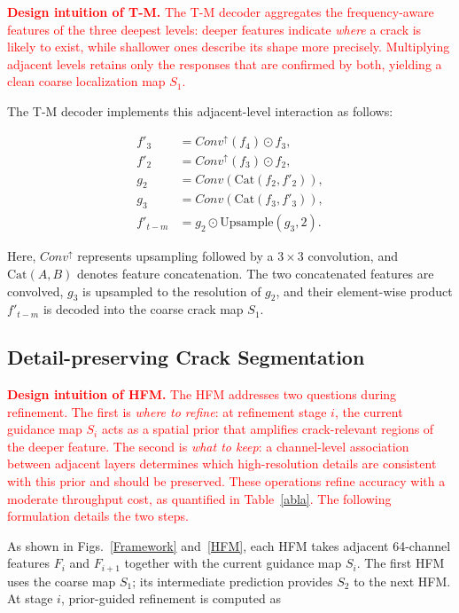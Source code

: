 \documentclass[journal]{IEEEtran}
\begin{document}
\textcolor{red}{\textbf{Design intuition of T-M.} The T-M decoder aggregates the frequency-aware features of the three deepest levels: deeper features indicate \emph{where} a crack is likely to exist, while shallower ones describe its shape more precisely. Multiplying adjacent levels retains only the responses that are confirmed by both, yielding a clean coarse localization map $S_1$.}

The T-M decoder implements this adjacent-level interaction as follows:

\begin{equation}
\begin{split}
    f'_3 &= Conv^ {\uparrow }(f_4)   \odot f_3, \\
    f'_2 &= Conv^ {\uparrow }(f_3)   \odot f_2, \\
    g_2 &= Conv(\text{Cat}(f_2,f'_2)), \\
    g_3 &= Conv(\text{Cat}(f_3,f'_3)), \\
    f'_{t-m} &= g_2 \odot \text{Upsample}(g_3,2).
\end{split}
\end{equation}

Here, $Conv^{\uparrow}$ represents upsampling followed by a $3 \times 3$ convolution, and $\text{Cat}(A,B)$ denotes feature concatenation. The two concatenated features are convolved, $g_3$ is upsampled to the resolution of $g_2$, and their element-wise product $f'_{t-m}$ is decoded into the coarse crack map $S_1$.



\subsection{{Detail-preserving Crack Segmentation}} \label{sec:Detail-preserving-Fine-Localization}

\textcolor{red}{\textbf{Design intuition of HFM.} The HFM addresses two questions during refinement. The first is \emph{where to refine}: at refinement stage $i$, the current guidance map $S_i$ acts as a spatial prior that amplifies crack-relevant regions of the deeper feature. The second is \emph{what to keep}: a channel-level association between adjacent layers determines which high-resolution details are consistent with this prior and should be preserved. These operations refine accuracy with a moderate throughput cost, as quantified in Table~\ref{abla}. The following formulation details the two steps.}

As shown in Figs.~\ref{Framework} and~\ref{HFM}, each HFM takes adjacent 64-channel features $F_i$ and $F_{i+1}$ together with the current guidance map $S_i$. The first HFM uses the coarse map $S_1$; its intermediate prediction provides $S_2$ to the next HFM. At stage $i$, prior-guided refinement is computed as
\end{document}
